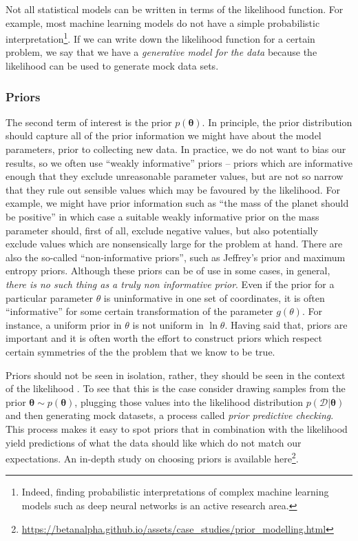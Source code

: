 \documentclass[12pt,dvipsnames]{report}
\renewcommand{\vec}[1]{\boldsymbol{\mathbf{#1}}}
\begin{document}
Not all statistical models can be written in terms of the likelihood function.
For example, most machine learning models do not have a simple probabilistic
interpretation\footnote{Indeed, finding probabilistic interpretations of
    complex machine learning models such as deep neural networks is an active
    research area.}. If we can write down the likelihood function for a certain
problem, we say that we have a \emph{generative model for the data} because the
likelihood can be used to generate mock data sets.

\subsubsection{Priors}
The second term of interest is the prior $p(\vec{\theta})$. In principle, the
prior distribution should capture all of the prior information we might have about the
model parameters, prior to collecting new data. In practice, we do not want to
bias our results, so we often use ``weakly informative'' priors -- priors
which are informative enough that they exclude unreasonable parameter values, but
are not so narrow that they rule out sensible values which may be favoured by the
likelihood. For example, we might have prior information such as ``the mass of
the planet should be positive'' in which case a suitable weakly informative
prior on the mass parameter should, first of all, exclude negative values, but
also potentially exclude values which are nonsensically large for the problem
at hand. There are also the so-called ``non-informative priors'', such as
Jeffrey's prior and maximum entropy priors. Although these priors can be of use
in some cases, in general, \emph{there is no such thing as a truly non
    informative prior}. Even if the prior for a particular parameter $\theta$ is
uninformative in one set of coordinates, it is often ``informative'' for some
certain transformation of the parameter $g(\theta)$. For instance, a uniform
prior in $\theta$ is not uniform in $\ln\theta$. Having said that, priors are important 
and it is often
worth the effort to construct priors which respect certain symmetries of the
the problem that we know to be true.

Priors should not be seen in isolation, rather, they should be seen in the
context of the likelihood \citep{arXiv:1708.07487}. To see that this is the
case consider drawing samples from the prior $\vec{\theta}\sim
    p(\vec{\theta})$, plugging those values into the likelihood distribution
$p(\mathcal{D}|\vec{\theta})$ and then generating mock datasets, a process
called \emph{prior predictive checking}. This process makes it easy to spot
priors that in combination with the likelihood yield predictions of what the
data should like which do not match our expectations. 
An in-depth study on choosing priors is available 
here\footnote{\url{https://betanalpha.github.io/assets/case_studies/prior_modelling.html}}.
\end{document}
